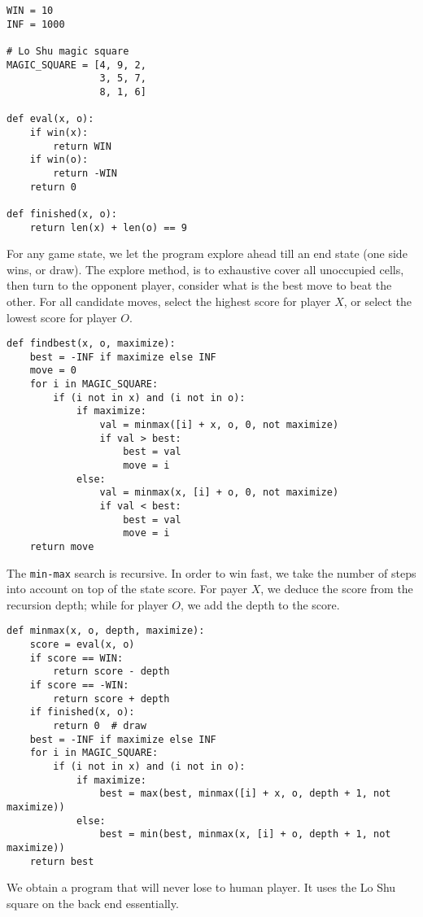 \documentclass[UTF8]{article}
\begin{document}
\begin{enumerate}
\begin{lstlisting}
WIN = 10
INF = 1000

# Lo Shu magic square
MAGIC_SQUARE = [4, 9, 2,
                3, 5, 7,
                8, 1, 6]

def eval(x, o):
    if win(x):
        return WIN
    if win(o):
        return -WIN
    return 0

def finished(x, o):
    return len(x) + len(o) == 9
\end{lstlisting}

For any game state, we let the program explore ahead till an end state (one side wins, or draw). The explore method, is to exhaustive cover all unoccupied cells, then turn to the opponent player, consider what is the best move to beat the other. For all candidate moves, select the highest score for player $X$, or select the lowest score for player $O$.

\begin{lstlisting}
def findbest(x, o, maximize):
    best = -INF if maximize else INF
    move = 0
    for i in MAGIC_SQUARE:
        if (i not in x) and (i not in o):
            if maximize:
                val = minmax([i] + x, o, 0, not maximize)
                if val > best:
                    best = val
                    move = i
            else:
                val = minmax(x, [i] + o, 0, not maximize)
                if val < best:
                    best = val
                    move = i
    return move
\end{lstlisting}

The \texttt{min-max} search is recursive. In order to win fast, we take the number of steps into account on top of the state score. For payer $X$, we deduce the score from the recursion depth; while for player $O$, we add the depth to the score.

\begin{lstlisting}
def minmax(x, o, depth, maximize):
    score = eval(x, o)
    if score == WIN:
        return score - depth
    if score == -WIN:
        return score + depth
    if finished(x, o):
        return 0  # draw
    best = -INF if maximize else INF
    for i in MAGIC_SQUARE:
        if (i not in x) and (i not in o):
            if maximize:
                best = max(best, minmax([i] + x, o, depth + 1, not maximize))
            else:
                best = min(best, minmax(x, [i] + o, depth + 1, not maximize))
    return best
\end{lstlisting}

We obtain a program that will never lose to human player. It uses the Lo Shu square on the back end essentially.


\end{enumerate}
\end{document}
